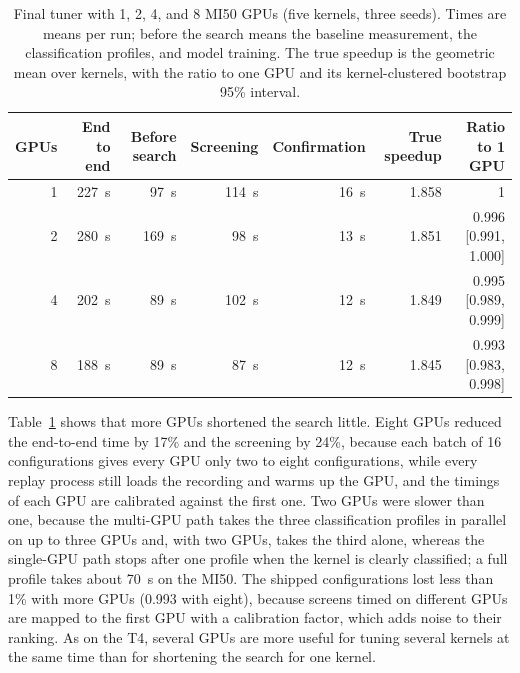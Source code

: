\documentclass[10pt]{article}
\begin{document}
\begin{table}[t]
\centering
\caption{Final tuner with 1, 2, 4, and 8 MI50 GPUs (five kernels, three seeds). Times are means per run; before the search means the baseline measurement, the classification profiles, and model training. The true speedup is the geometric mean over kernels, with the ratio to one GPU and its kernel-clustered bootstrap 95\% interval.}
\label{tab:mi50gpus}
\small
\begin{tabular}{rrrrrrr}
\toprule
GPUs & End to end & Before search & Screening & Confirmation & True speedup & Ratio to 1 GPU \\
\midrule
1 & 227~s & 97~s & 114~s & 16~s & 1.858 & 1 \\
2 & 280~s & 169~s & 98~s & 13~s & 1.851 & 0.996 [0.991, 1.000] \\
4 & 202~s & 89~s & 102~s & 12~s & 1.849 & 0.995 [0.989, 0.999] \\
8 & 188~s & 89~s & 87~s & 12~s & 1.845 & 0.993 [0.983, 0.998] \\
\bottomrule
\end{tabular}
\end{table}

Table~\ref{tab:mi50gpus} shows that more GPUs shortened the search little.
Eight GPUs reduced the end-to-end time by 17\% and the screening by 24\%,
because each batch of 16 configurations gives every GPU only two to eight
configurations, while every replay process still loads the recording and warms
up the GPU, and the timings of each GPU are calibrated against the first one.
Two GPUs were slower than one, because the multi-GPU path takes the three
classification profiles in parallel on up to three GPUs and, with two GPUs,
takes the third alone, whereas the single-GPU path stops after one profile when
the kernel is clearly classified; a full profile takes about 70~s on the MI50.
The shipped configurations lost less than 1\% with more GPUs (0.993 with eight),
because screens timed on different GPUs are mapped to the first GPU with a
calibration factor, which adds noise to their ranking. As on the T4, several
GPUs are more useful for tuning several kernels at the same time than for
shortening the search for one kernel.
\end{document}
